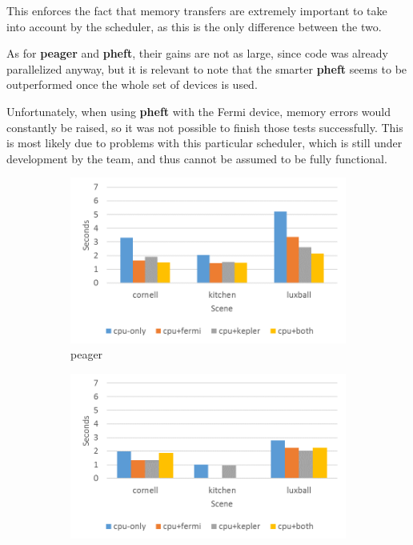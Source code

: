\documentclass[main.tex]{subfiles}
\begin{document}
This enforces the fact that memory transfers are extremely important to take into account by the scheduler, as this is the only difference between the two.

As for \textbf{peager} and \textbf{pheft}, their gains are not as large, since \cpu code was already parallelized anyway, but it is relevant to note that the smarter \textbf{pheft} seems to be outperformed once the whole set of devices is used.

Unfortunately, when using \textbf{pheft} with the Fermi device, memory errors would constantly be raised, so it was not possible to finish those tests successfully. This is most likely due to problems with this particular scheduler, which is still under development by the \starpu team, and thus cannot be assumed to be fully functional.

\begin{figure}[!htp]
  \centering
  \begin{subfigure}{.5\textwidth}
    \centering
    \includegraphics[width=\linewidth]{profiling/starpu_sched_peager}
    \caption{peager \label{fig:prof:starpu_sched_peager}}
  \end{subfigure}%
  \begin{subfigure}{.5\textwidth}
    \centering
    \includegraphics[width=\linewidth]{profiling/starpu_sched_pheft}

\end{subfigure}
\end{figure}
\end{document}
